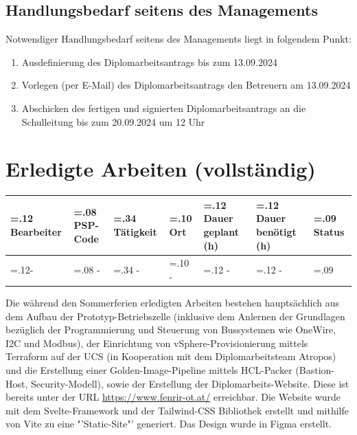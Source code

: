 \documentclass[
	headings=optiontotocandhead,%
	oneside,
	numbers=noenddot,%
	toc=flat, %
	10pt, %
	parskip=full, %
	listof=totoc, %
	listof=flat, %
	numbers=noenddot, %
	bibliography=totoc, %
	a4paper,DIV=14,
]{scrartcl}
\begin{document}
\subsection{Handlungsbedarf seitens des Managements}
Notwendiger Handlungsbedarf seitens des Managements liegt in folgendem Punkt:

\begin{enumerate}
	\item Ausdefinierung des Diplomarbeitsantrags bis zum 13.09.2024
	\item Vorlegen (per E-Mail) des Diplomarbeitsantrags den Betreuern am 13.09.2024
	\item Abschicken des fertigen und signierten Diplomarbeitsantrags an die Schulleitung bis zum 20.09.2024 um 12 Uhr
\end{enumerate}

\section{Erledigte Arbeiten (vollständig)}
\begin{table}[h]
	\begin{tabularx} {\textwidth} {
			|>{\hsize=.12\hsize}X
			|>{\hsize=.08\hsize}X
			|>{\hsize=.34\hsize}X
			|>{\hsize=.10\hsize}X
			|>{\hsize=.12\hsize}X
			|>{\hsize=.12\hsize}X
			|>{\hsize=.09\hsize}X|
		}
		
		\hline
		\rowcolor[HTML]{D9D9D9} 
		\textbf{\normalsize{Bearbeiter}} & \textbf{\normalsize{PSP-Code}} & {\textbf{\normalsize{Tätigkeit}}} & \textbf{\normalsize{Ort}} & \textbf{\normalsize{Dauer geplant (h)}} & \textbf{\normalsize{Dauer benötigt (h)}} & \textbf{\normalsize{Status}} \\ \hline
		- & - & - & - & - & - & \cellcolor{green!30} \\ \hline
	\end{tabularx}
\end{table}

Die während den Sommerferien erledigten Arbeiten bestehen hauptsächlich aus dem Aufbau der Prototyp-Betriebszelle (inklusive dem Anlernen der Grundlagen bezüglich der Programmierung und Steuerung von Bussystemen wie OneWire, I2C und Modbus), der Einrichtung von vSphere-Provisionierung mittels Terraform auf der UCS (in Kooperation mit dem Diplomarbeitsteam Atropos) und die Erstellung einer Golden-Image-Pipeline mittels HCL-Packer (Bastion-Host, Security-Modell), sowie der Erstellung der Diplomarbeits-Website. Diese ist bereits unter der URL \url{https://www.fenrir-ot.at/} erreichbar. Die Website wurde mit dem Svelte-Framework und der Tailwind-CSS Bibliothek erstellt und mithilfe von Vite zu eine "'Static-Site"' generiert. Das Design wurde in Figma erstellt.
\end{document}

